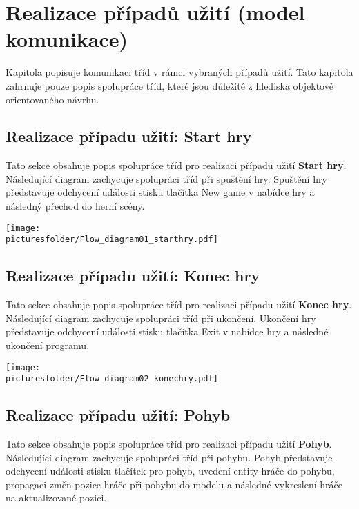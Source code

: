 \documentclass[12pt,a4paper]{article}
\def\picturesfolder{obrazky}
\begin{document}

\section{Realizace případů užití (model komunikace)}

Kapitola popisuje komunikaci tříd v rámci vybraných případů užití.  Tato
kapitola zahrnuje pouze popis spolupráce tříd, které jsou důležité z hlediska
objektově orientovaného návrhu.

\subsection{Realizace případu užití: Start hry}

Tato sekce obsahuje popis spolupráce tříd pro realizaci případu užití
\textbf{Start hry}. Následující diagram zachycuje spolupráci tříd při spuštění
hry. Spuštění hry představuje odchycení události stisku tlačítka New game v
nabídce hry a následný přechod do herní scény.

\begin{center}
\texttt{[image: \\picturesfolder/Flow\_diagram01\_starthry.pdf]}
\end{center}

\subsection{Realizace případu užití: Konec hry}

Tato sekce obsahuje popis spolupráce tříd pro realizaci případu užití
\textbf{Konec hry}. Následující diagram zachycuje spolupráci tříd při ukončení.
Ukončení hry představuje odchycení události stisku tlačítka Exit v nabídce hry a
následné ukončení programu.

\begin{center}
\texttt{[image: \\picturesfolder/Flow\_diagram02\_konechry.pdf]}
\end{center}

\subsection{Realizace případu užití: Pohyb}

Tato sekce obsahuje popis spolupráce tříd pro realizaci případu užití
\textbf{Pohyb}. Následující diagram zachycuje spolupráci tříd při pohybu. Pohyb
představuje odchycení události stisku tlačítek pro pohyb, uvedení entity hráče
do pohybu, propagaci změn pozice hráče při pohybu do modelu a následné
vykreslení hráče na aktualizované pozici.
\end{document}
